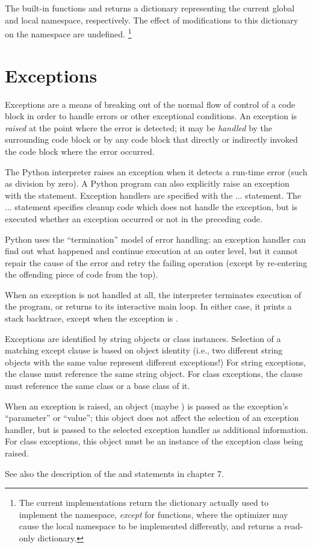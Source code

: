 The built-in functions  and  returns a
dictionary representing the current global and local namespace,
respectively.  The effect of modifications to this dictionary on the
namespace are undefined.%
\footnote{The current implementations return the dictionary actually 
used to implement the namespace, {\em except} for functions, where
the optimizer may cause the local namespace to be implemented
differently, and  returns a read-only dictionary.}

\section{Exceptions}

Exceptions are a means of breaking out of the normal flow of control
of a code block in order to handle errors or other exceptional
conditions.  An exception is {\em raised} at the point where the error
is detected; it may be {\em handled} by the surrounding code block or
by any code block that directly or indirectly invoked the code block
where the error occurred.

The Python interpreter raises an exception when it detects a run-time
error (such as division by zero).  A Python program can also
explicitly raise an exception with the  statement.
Exception handlers are specified with the  ... 
statement.  The  ...  statement
specifies cleanup code which does not handle the exception, but is
executed whether an exception occurred or not in the preceding code.

Python uses the ``termination'' model of error handling: an exception
handler can find out what happened and continue execution at an outer
level, but it cannot repair the cause of the error and retry the
failing operation (except by re-entering the offending piece of
code from the top).

When an exception is not handled at all, the interpreter terminates
execution of the program, or returns to its interactive main loop.  In
either case, it prints a stack backtrace, except when the exception is 
.

Exceptions are identified by string objects or class instances.
Selection of a matching except clause is based on object identity
(i.e., two different string objects with the same value represent
different exceptions!)  For string exceptions, the 
clause must reference the same string object.  For class exceptions,
the  clause must reference the same class or a base
class of it.

When an exception is raised, an object (maybe ) is passed
as the exception's ``parameter'' or ``value''; this object does not
affect the selection of an exception handler, but is passed to the
selected exception handler as additional information.  For class
exceptions, this object must be an instance of the exception class
being raised.

See also the description of the  and 
statements in chapter 7.
